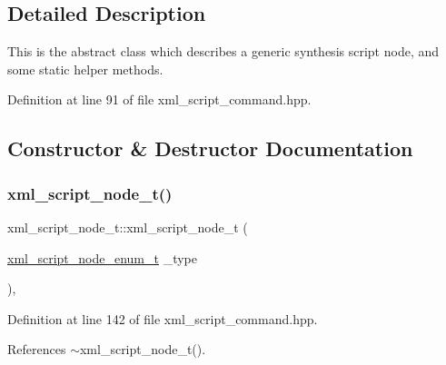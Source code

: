 \subsection{Detailed Description}
This is the abstract class which describes a generic synthesis script node, and some static helper methods. 

Definition at line 91 of file xml\+\_\+script\+\_\+command.\+hpp.



\subsection{Constructor \& Destructor Documentation}
\mbox{\label{classxml__script__node__t_aace8091f12771c1bb40433e1222a9305}} 
\subsubsection{\texorpdfstring{xml\+\_\+script\+\_\+node\+\_\+t()}{xml\_script\_node\_t()}}
{\footnotesize\ttfamily xml\+\_\+script\+\_\+node\+\_\+t\+::xml\+\_\+script\+\_\+node\+\_\+t (\begin{DoxyParamCaption}\item[{\hyperlink{xml__script__command_8hpp_a3f764b80e60a34ae77719e7f4616a59b}{xml\+\_\+script\+\_\+node\+\_\+enum\+\_\+t}}]{\+\_\+type }\end{DoxyParamCaption})\hspace{0.3cm}{\ttfamily [inline]}, {\ttfamily [explicit]}}



Definition at line 142 of file xml\+\_\+script\+\_\+command.\+hpp.



References $\sim$xml\+\_\+script\+\_\+node\+\_\+t().

